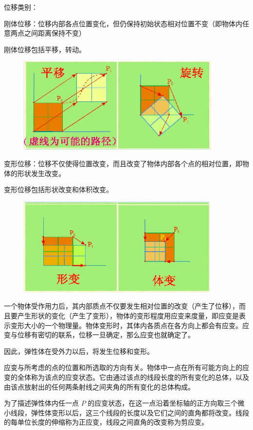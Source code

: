 \documentclass[12pt,a4paper]{article}
\begin{document}
位移类别：

刚体位移：位移内部各点位置变化，但仍保持初始状态相对位置不变（即物体内任意两点之间距离保持不变）

刚体位移包括平移，转动。

\begin{figure}[H]
\centering
\includegraphics[scale=0.5]{./figures/10.png}
\caption{}
\end{figure}

变形位移：位移不仅使得位置改变，而且改变了物体内部各个点的相对位置，即物体的形状发生改变。

变形位移包括形状改变和体积改变。

\begin{figure}[H]
\centering
\includegraphics[scale=0.5]{./figures/11.png}
\caption{}
\end{figure}

一个物体受作用力后，其内部质点不仅要发生相对位置的改变（产生了位移），而且要产生形状的变化（产生了变形），物体的变形程度用应变来度量，即应变是表示变形大小的一个物理量。物体变形时，其体内各质点在各方向上都会有应变。应变与位移有密切的联系，位移一旦确定，那么应变也就确定了。

因此，弹性体在受外力以后，将发生位移和变形。

应变与所考虑的点的位置和所选取的方向有关。物体中一点在所有可能方向上的应变的全体称为该点的应变状态。它由通过该点的线段长度的所有变化的总体，以及由该点放射出的任何两条射线之间夹角的所有变化的总体构成。

为了描述弹性体内任一点 $P$ 的应变状态，在这一点沿着坐标轴的正方向取三个微小线段，弹性体变形以后，这三个线段的长度以及它们之间的直角都将改变。线段的每单位长度的伸缩称为正应变，线段之间直角的改变称为剪应变。
\end{document}
